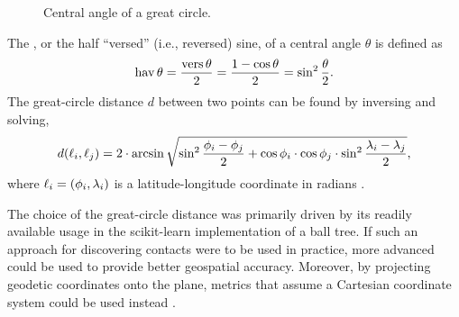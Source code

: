 
\begin{figure}[htbp]
\centering
{}
\caption[Central angle of a great circle]{Central angle of a great circle.}
\label{fig:central-angle}
\end{figure}

The , or the half ``versed'' (i.e., reversed) sine, of a central angle $\theta$ is defined as
\begin{equation}
  \operatorname{hav} \theta = \frac{\operatorname{vers} \theta}{2}  = \frac{1 - \cos \theta}{2}= \sin^2 \frac{\theta}{2}. \label{eq:hav}
\end{equation}
The great-circle distance $d$ between two points can be found by inversing  and solving,
\begin{equation*}
  d(\ell_i, \ell_j) = 2 \cdot \arcsin \sqrt{\sin^2 \frac{\phi_i - \phi_j}{2} + \cos \phi_i \cdot \cos\phi_j \cdot \sin^2 \frac{\lambda_i - \lambda_j}{2}},
\end{equation*}
where $\ell_i = (\phi_i, \lambda_i)$ is a latitude-longitude coordinate in radians \cite[pp. 157--162]{Brummelen2013}.

The choice of the great-circle distance was primarily driven by its readily available usage in the scikit-learn \cite{sklearn2013} implementation of a ball tree. If such an approach for discovering contacts were to be used in practice, more advanced  \cite[pp. 71--130]{Lu2014} could be used to provide better geospatial accuracy. Moreover, by projecting geodetic coordinates onto the plane, metrics that assume a Cartesian coordinate system could be used instead \cite[pp. 265--326]{Lu2014}.

